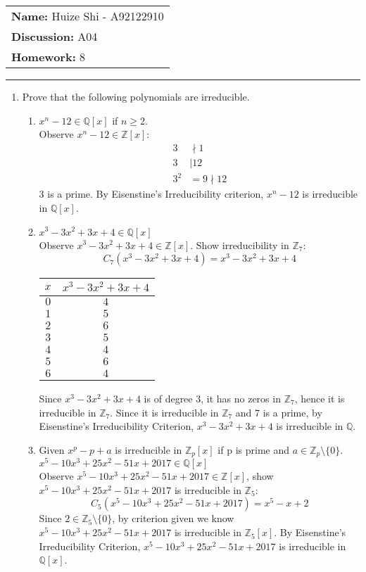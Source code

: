 \documentclass[12pt]{article}
\begin{document}
\null\hfill\begin{tabular}[t]{l@{}}
	\textbf{Name: }Huize Shi - A92122910 \\
	\textbf{Discussion: }A04 \\
	\textbf{Homework: }8
\end{tabular}
\noindent\rule{\textwidth}{0.5pt}

\begin{enumerate}
	\item Prove that the following polynomials are irreducible.
	\begin{enumerate}
		\item $x^n - 12 \in \mathbb{Q}[x]$ if $n\ge 2$.\\
			Observe $x^n - 12 \in \mathbb{Z}[x]$:
			\begin{align*}
				3 &\nmid 1\\
				3 &\mid 12\\
				3^2 &= 9 \nmid 12
			\end{align*}
			3 is a prime. By Eisenstine's Irreducibility criterion, $x^n - 12$ is
			irreducible in $\mathbb{Q}[x]$.

		\item $x^3 - 3x^2 + 3x + 4 \in \mathbb{Q}[x]$\\
			Observe $x^3 - 3x^2 + 3x + 4 \in \mathbb{Z}[x]$. Show irreducibility in
			$\mathbb{Z}_7$:
			$$C_7(x^3 - 3x^2 + 3x + 4) = x^3 - 3x^2 + 3x + 4$$
			\begin{center}
				\begin{tabular} {c | c}
					$x$ & $x^3 - 3x^2 + 3x + 4$\\
					\hline
					$0$ & $4$\\
					$1$ & $5$\\
					$2$ & $6$\\
					$3$ & $5$\\
					$4$ & $4$\\
					$5$ & $6$\\
					$6$ & $4$\\
				\end{tabular}
			\end{center}
			Since $x^3 - 3x^2 + 3x + 4$ is of degree 3, it has no zeros in
			$\mathbb{Z}_7$, hence it is irreducible in $\mathbb{Z}_7$. Since it is
			irreducible in $\mathbb{Z}_7$ and 7 is a prime, by Eisenstine's
			Irreducibility Criterion, $x^3 - 3x^2 + 3x + 4$ is irreducible in
			$\mathbb{Q}$.

		\item Given $x^p-p+a$ is irreducible in $\mathbb{Z}_p[x]$ if p is prime and
			$a \in \mathbb{Z}_p \setminus \{0\}$. $x^5 - 10x^3 + 25x^2 - 51x + 2017
			\in \mathbb{Q}[x]$\\
			Observe $x^5 - 10x^3 + 25x^2 - 51x + 2017 \in \mathbb{Z}[x]$, show $x^5 -
			10x^3 + 25x^2 - 51x + 2017$ is irreducible in $\mathbb{Z}_5$:
			$$C_5(x^5 - 10x^3 + 25x^2 - 51x + 2017) = x^5 - x + 2$$
			Since $2 \in \mathbb{Z}_5 \setminus \{0\}$, by criterion given we know
			$x^5 - 10x^3 + 25x^2 - 51x + 2017$ is irreducible in $\mathbb{Z}_5[x]$. By
			Eisenstine's Irreducibility Criterion, $x^5 - 10x^3 + 25x^2 - 51x + 2017$
			is irreducible in $\mathbb{Q}[x]$.
		

\end{enumerate}
\end{enumerate}
\end{document}
